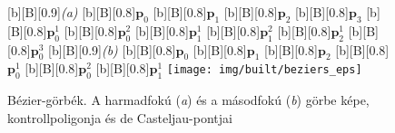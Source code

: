 \documentclass[12pt]{report}
\theoremstyle{definition}
\begin{document}
  \begin{figure}
  [b][B][0.9]{\emph{(a)}}
  [b][B][0.8]{\bf{$\boldsymbol{p}_{0}$}}
  [b][B][0.8]{\bf{$\boldsymbol{p}_{1}$}}
  [b][B][0.8]{\bf{$\boldsymbol{p}_{2}$}}
  [b][B][0.8]{\bf{$\boldsymbol{p}_{3}$}}
  [b][B][0.8]{\bf{$\boldsymbol{p}_{0}^{1}$}}
  [b][B][0.8]{\bf{$\boldsymbol{p}_{0}^{2}$}}
  [b][B][0.8]{\bf{$\boldsymbol{p}_{1}^{1}$}}
  [b][B][0.8]{\bf{$\boldsymbol{p}_{1}^{2}$}}
  [b][B][0.8]{\bf{$\boldsymbol{p}_{2}^{1}$}}
  [b][B][0.8]{\bf{$\boldsymbol{p}_{0}^{3}$}}
  [b][B][0.9]{\emph{(b)}}
  [b][B][0.8]{\bf{$\boldsymbol{p}_{0}$}}
  [b][B][0.8]{\bf{$\boldsymbol{p}_{1}$}}
  [b][B][0.8]{\bf{$\boldsymbol{p}_{2}$}}
  [b][B][0.8]{\bf{$\boldsymbol{p}_{0}^{1}$}}
  [b][B][0.8]{\bf{$\boldsymbol{p}_{0}^{2}$}}
  [b][B][0.8]{\bf{$\boldsymbol{p}_{1}^{1}$}}
    \centering
    \texttt{[image: img/built/beziers\_eps]}
    \caption{\label{fig:beziers} Bézier-görbék. A harmadfokú (\emph{a}) és a
    másodfokú (\emph{b}) görbe képe, kontrollpoligonja és de
    Casteljau-pontjai}
  \end{figure}
\end{document}
